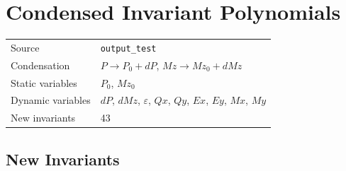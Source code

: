 \documentclass{article}
\begin{document}
\section*{Condensed Invariant Polynomials}

\begin{tabular}{ll}
\toprule
Source & \texttt{output_test} \\
Condensation & $P \to P_{0} + dP$, $Mz \to Mz_{0} + dMz$ \\
Static variables & $P_{0}$, $Mz_{0}$ \\
Dynamic variables & $dP$, $dMz$, $ε$, $Qx$, $Qy$, $Ex$, $Ey$, $Mx$, $My$ \\
New invariants & 43 \\
\bottomrule
\end{tabular}

\subsection*{New Invariants}
\end{document}
